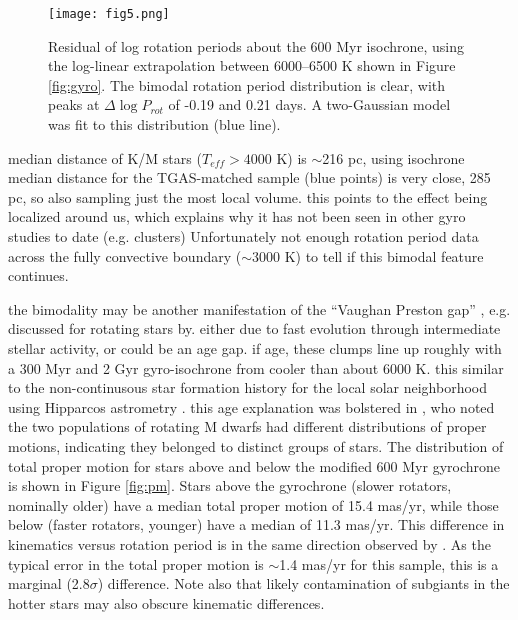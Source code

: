 \documentclass[manuscript, letterpaper]{aastex6}
\makeatletter
\let\origsection\section
\renewcommand\section{\@ifstar{\starsection}{\nostarsection}}
\newcommand\nostarsection[1]{\sectionprelude\origsection{#1}}
\newcommand\starsection[1]{\sectionprelude\origsection*{#1}}
\newcommand\sectionprelude{\vspace{1em}}
\makeatother
\begin{document}
\begin{figure}[]
\centering
\texttt{[image: fig5.png]}
\caption{Residual of log rotation periods about the \citet{meibom2011} 600 Myr isochrone, using the log-linear extrapolation between 6000--6500 K shown in Figure \ref{fig:gyro}. The bimodal rotation period distribution is clear, with peaks at $\Delta \log P_{rot}$ of -0.19 and 0.21 days. A two-Gaussian model was fit to this distribution (blue line).
}
\label{fig:diff}
\end{figure}





\section{Discussion}


median distance of K/M stars ($T_{eff} > 4000$ K) is $\sim$216 pc, using isochrone
median distance for the TGAS-matched sample (blue points) is very close, 285 pc, so also sampling just the most local volume.
this points to the effect being localized around us, which explains why it has not been seen in other gyro studies to date (e.g. clusters)
Unfortunately not enough rotation period data across the fully convective boundary ($\sim$3000 K) to tell if this bimodal feature continues.



the bimodality may be another manifestation of the ``Vaughan Preston gap'' \citep{vaughan1980}, e.g. discussed for rotating stars by\citet{kado-fong2016}.
either due to fast evolution through intermediate stellar activity, or could be an age gap. if age, these clumps line up roughly with a 300 Myr and 2 Gyr \citet{meibom2011} gyro-isochrone from cooler than about 6000 K. this similar to the non-continusous star formation history for the local solar neighborhood using Hipparcos astrometry \citep{hernandez2000}. this age explanation was bolstered in \citet{mcquillan2013}, who noted the two populations of rotating M dwarfs had different distributions of proper motions, indicating they belonged to distinct groups of stars. The distribution of total proper motion for stars above and below the modified 600 Myr gyrochrone is shown in Figure \ref{fig:pm}. Stars above the gyrochrone (slower rotators, nominally older) have a median total proper motion of 15.4 mas/yr, while those below (faster rotators, younger)  have a median of 11.3 mas/yr. This difference in kinematics versus rotation period is in the same direction observed by \citet{mcquillan2013}. As the typical error in the total proper motion is $\sim$1.4 mas/yr for this sample, this is a marginal (2.8$\sigma$) difference. Note also that likely contamination of subgiants in the hotter stars may also obscure kinematic differences.
\end{document}
